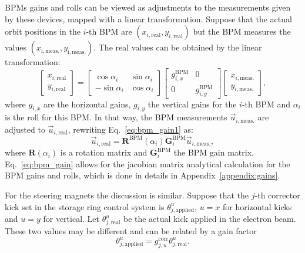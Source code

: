 BPMs gains and rolls can be viewed as adjustments to the measurements given by these devices, mapped with a linear transformation. Suppose that the actual orbit positions in the $i$-th BPM are $(x_{i, \mathrm{real}}, y_{i, \mathrm{real}})$ but the BPM measures the values $(x_{\mathrm{i, meas.}}, y_{\mathrm{i, meas.}})$. The real values can be obtained by the linear transformation:
\begin{equation}
    \begin{bmatrix}
      x_{i, \mathrm{real}} \\
      y_{i, \mathrm{real}}
\end{bmatrix} = \begin{bmatrix}
     \cos\alpha_i & \sin\alpha_i \\
     -\sin\alpha_i & \cos\alpha_i
 \end{bmatrix} \begin{bmatrix}
     g_{i, x}^{\mathrm{BPM}} & 0 \\
     0 & g_{i, y}^{\mathrm{BPM}}
 \end{bmatrix}
 \begin{bmatrix}
      x_{i, \mathrm{meas.}} \\
      y_{i, \mathrm{meas.}}
\end{bmatrix},
\label{eq:bpm_gain1}
\end{equation}
where $g_{i, x}$ are the horizontal gains, $g_{i, y}$ the vertical gains for the $i$-th BPM and $\alpha_i$ is the roll for this BPM. In that way, the BPM measurements $\vec{u}_{i, \mathrm{meas.}}$ are adjusted to $\vec{u}_{i, \mathrm{real}}$, rewriting Eq.~\eqref{eq:bpm_gain1} as:
\begin{equation}
    \vec{u}_{i, \mathrm{real}} = \mathbf{R}^{\mathrm{BPM}}\left(\alpha_i\right) \mathbf{G}_{i}^{\mathrm{BPM}} \vec{u}_{i, \mathrm{meas.}},
    \label{eq:bpm_gain}
\end{equation}
where $\mathbf{R}\left(\alpha_i\right)$ is a rotation matrix and $\mathbf{G}_{i}^{\mathrm{BPM}}$ the BPM gain matrix. Eq.~\eqref{eq:bpm_gain} allows for the jacobian matrix analytical calculation for the BPM gains and rolls, which is done in details in Appendix~\ref{appendix:gains}.

For the steering magnets the discussion is similar. Suppose that the $j$-th corrector kick set in the storage ring control system is $\theta_{j, \mathrm{applied}}^u$, $u=x$ for horizontal kicks and $u=y$ for vertical. Let $\theta_{j, \mathrm{real}}^u$ be the actual kick applied in the electron beam. These two values may be different and can be related by a gain factor
\begin{equation}
    \theta_{j, \mathrm{applied}}^u = g_{j, u}^{\mathrm{corr}}\theta_{j, \mathrm{real}}^u.
    \label{eq:corr_gain}
\end{equation}

